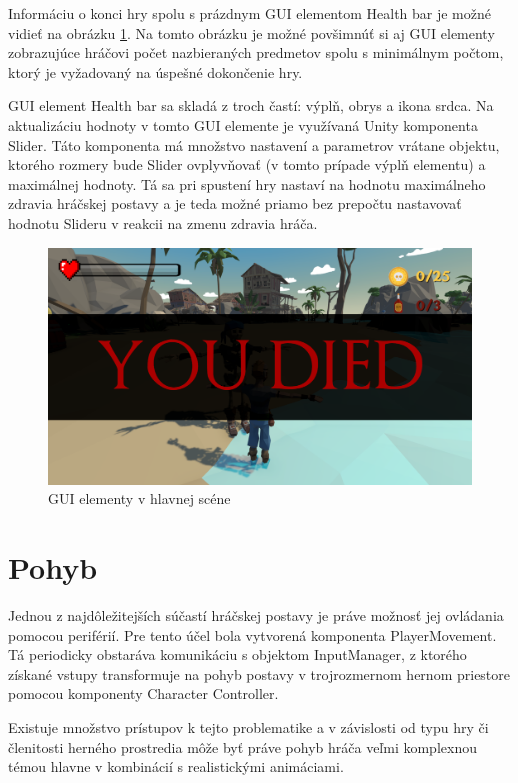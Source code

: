 \documentclass[slovak, master]{diploma}
\begin{document}
Informáciu o konci hry spolu s prázdnym GUI elementom Health bar je možné vidieť na obrázku \ref{pic:YouDied}. Na tomto obrázku je možné povšimnúť si aj GUI elementy zobrazujúce hráčovi počet nazbieraných predmetov spolu s minimálnym počtom, ktorý je vyžadovaný na úspešné dokončenie hry. 

GUI element Health bar sa skladá z troch častí: výplň, obrys a ikona srdca. Na aktualizáciu hodnoty v tomto GUI elemente je využívaná Unity komponenta Slider. Táto komponenta má množstvo nastavení a parametrov vrátane objektu, ktorého rozmery bude Slider ovplyvňovať (v tomto prípade výplň elementu) a maximálnej hodnoty. Tá sa pri spustení hry nastaví na hodnotu maximálneho zdravia hráčskej postavy a je teda možné priamo bez prepočtu nastavovať hodnotu Slideru v reakcii na zmenu zdravia hráča.

\begin{figure}[!htbp]
	\centering
	\includegraphics[width=.8\textwidth]{Figures/youDied.png}
	\caption{GUI elementy v hlavnej scéne}
	\label{pic:YouDied}
\end{figure}

\section{Pohyb}
\label{sec:PlayerMovement} 
Jednou z najdôležitejších súčastí hráčskej postavy je práve možnosť jej ovládania pomocou periférií. Pre tento účel bola vytvorená komponenta PlayerMovement. Tá periodicky obstaráva komunikáciu s objektom InputManager, z ktorého získané vstupy transformuje na pohyb postavy v trojrozmernom hernom priestore pomocou komponenty Character Controller.

Existuje množstvo prístupov k tejto problematike a v závislosti od typu hry či členitosti herného prostredia môže byť práve pohyb hráča veľmi komplexnou témou hlavne v kombinácií s realistickými animáciami.
\end{document}
